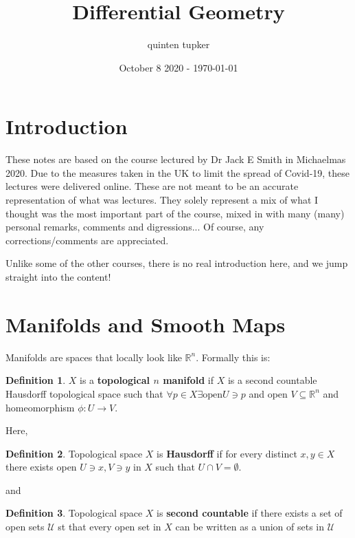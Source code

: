 \documentclass{article}
\title{Differential Geometry}
\author{quinten tupker}
\date{October 8 2020 - \today}
\theoremstyle{definition}
\newtheorem{definition}{Definition}
\begin{document}
\maketitle

\section*{Introduction}

These notes are based on the course lectured by Dr Jack E Smith in Michaelmas
2020. Due to the measures taken in the UK to limit the spread of
Covid-19, these lectures were delivered online. These are not meant to be an
accurate representation of what was lectures. They solely represent a mix of
what I thought was the most important part of the course, mixed in with many
(many) personal remarks, comments and digressions... Of course, any
corrections/comments are appreciated.

Unlike some of the other courses, there is no real introduction here, and we
jump straight into the content!

\section{Manifolds and Smooth Maps}

Manifolds are spaces that locally look like $\mathbb{R}^n$. Formally this is:

\begin{definition}
  $X$ is a \textbf{topological $n$ manifold} if $X$ is a second countable
  Hausdorff topological space such that $\forall p \in X \exists \text{open} U
  \ni p$ and open $V \subseteq \mathbb{R}^n$ and homeomorphism $\phi : U \to V$.
\end{definition}

Here,

\begin{definition}
  Topological space $X$ is \textbf{Hausdorff} if for every distinct $x, y \in X$ there
  exists open $U \ni x, V \ni y$ in $X$ such that $U \cap V = \emptyset$.
\end{definition}

and

\begin{definition}
  Topological space $X$ is \textbf{second countable} if there exists a set of
  open sets $\mathcal{U}$ st that every open set in $X$ can be written as a
  union of sets in $\mathcal{U}$
\end{definition}
\end{document}
